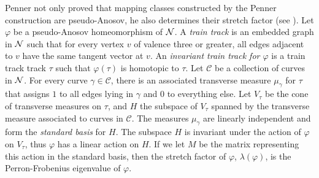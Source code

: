 
 Penner not only proved that mapping classes constructed by the Penner construction are pseudo-Anosov, he also determines their stretch factor (see \cite{penner1988construction}).  %
Let $\varphi$ be a pseudo-Anosov homeomorphism of $\mathcal{N}$.  A {\it train track} is an embedded graph in $\mathcal{N}$ such that for every vertex $v$ of valence three or greater, all edges adjacent to $v$ have the same tangent vector at $v$.  An {\it invariant train track for $\varphi$} is a train track track $\tau$ such that $\varphi(\tau)$ is homotopic to $\tau$.  Let $\mathcal{C}$ be a collection of curves in $\mathcal{N}$. %
For every curve $\gamma \in\mathcal{C}$, there is an associated transverse measure
$\mu_\gamma$ for $\tau$ that assigns $1$ to all edges lying in $\gamma$ and 0 to everything else. Let $V_\tau$
be the cone of transverse measures on $\tau$, and $H$ the subspace of $V_\tau$ spanned by the
transverse measure associated to curves in $\mathcal{C}$.
The measures $\mu_\gamma$ are linearly independent and form the \textit{standard basis} for $H$. The subspace $H$ is invariant under the action of $\varphi$ on $V_\tau$, thus $\varphi$ has a linear action on $H$. If we let $M$
be the matrix representing this action in the standard basis, then the stretch factor of $\varphi$,
$\lambda(\varphi)$, is the Perron-Frobenius eigenvalue of $\varphi$.

